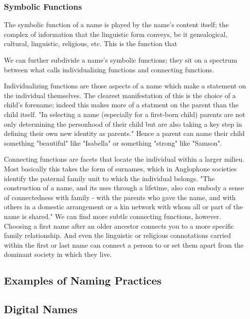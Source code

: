 \subsubsection{Symbolic Functions}

The symbolic function of a name is played by the name's content itself; the
complex of information that the linguistic form conveys, be it genealogical,
cultural, linguistic, religious, etc. This is the function that 

We can further subdivide a name's symbolic functions; they sit on a spectrum
between what \textcite{finch08} calls individualizing functions and connecting
functions.

Individualizing functions are those aspects of a name which make a statement on
the individual themselves. The clearest manifestation of this is the choice of a
child's forename; indeed this makes more of a statment on the parent than the
child itself. "In selecting a name (especially for a first-born child) parents
are not only determining the personhood of their child but are also taking a key
step in defining their own new identity as parents." \parencite[718]{finch08}
Hence a parent can name their child something "beautiful" like "Isabella" or
something "strong" like "Samson".

Connecting functions are facets that locate the individual within a larger
milieu. Most basically this takes the form of surnames, which in Anglophone
societies identify the paternal family unit to which the individual belongs.
"The construction of a name, and its uses through a lifetime, also can embody a
sense of connectedness with family - with the parents who gave the name, and
with others in a domestic arrangement or a kin network with whom all or part of
the name is shared." \parencite[711]{finch08} We can find more subtle connecting
functions, however. Choosing a first name after an older ancestor connects you
to a more specific family relationship. And even the linguistic or religious
connotations carried within the first or last name can connect a person to or
set them apart from the dominant society in which they live.

\subsection{Examples of Naming Practices}



\subsection{Digital Names}

